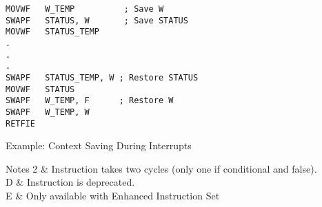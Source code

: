 \documentclass{sheet}
\begin{document}
\begin{multicols}{3}
\begin{lrbox}{\ExampleISR}
\begin{lstlisting}
MOVWF   W_TEMP          ; Save W
SWAPF   STATUS, W       ; Save STATUS
MOVWF   STATUS_TEMP
.
.
.
SWAPF   STATUS_TEMP, W ; Restore STATUS
MOVWF   STATUS
SWAPF   W_TEMP, F      ; Restore W
SWAPF   W_TEMP, W
RETFIE
\end{lstlisting}\end{lrbox}
\begin{table-X}{Example: Context Saving During Interrupts}
\usebox\ExampleISR\\
\end{table-X}
%
\begin{table-lX}{Notes}
2	& Instruction takes two cycles (only one if conditional and false). \\
D	& Instruction is deprecated. \\
E	& Only available with Enhanced Instruction Set \\
\end{table-lX}
%
\end{multicols}
\end{document}
